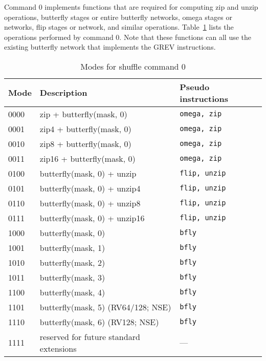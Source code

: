 Command 0 implements functions that are required for computing zip and unzip
operations, butterfly stages or entire butterfly networks, omega stages or networks, flip
stages or network, and similar operations. Table~\ref{shuffle-modes} lists the
operations performed by command 0. Note that these functions can all use the
existing butterfly network that implements the GREV instructions.

\begin{table}[h]
\begin{small}
\begin{center}
\begin{tabular}{l l l}
Mode & Description & Pseudo instructions \\ \hline

0000 & zip + butterfly(mask, 0)                    & {\tt omega, zip} \\
0001 & zip4 + butterfly(mask, 0)                   & {\tt omega, zip} \\
0010 & zip8 + butterfly(mask, 0)                   & {\tt omega, zip} \\
0011 & zip16 + butterfly(mask, 0)                  & {\tt omega, zip} \\
0100 & butterfly(mask, 0) + unzip                  & {\tt flip, unzip} \\
0101 & butterfly(mask, 0) + unzip4                 & {\tt flip, unzip} \\
0110 & butterfly(mask, 0) + unzip8                 & {\tt flip, unzip} \\
0111 & butterfly(mask, 0) + unzip16                & {\tt flip, unzip} \\

\hline

1000 & butterfly(mask, 0)                          & {\tt bfly} \\
1001 & butterfly(mask, 1)                          & {\tt bfly} \\
1010 & butterfly(mask, 2)                          & {\tt bfly} \\
1011 & butterfly(mask, 3)                          & {\tt bfly} \\
1100 & butterfly(mask, 4)                          & {\tt bfly} \\
1101 & butterfly(mask, 5) (RV64/128; NSE)          & {\tt bfly} \\
1110 & butterfly(mask, 6) (RV128; NSE)             & {\tt bfly} \\
1111 & reserved for future standard extensions     & --- \\

\end{tabular}
\end{center}
\end{small}
\caption{Modes for shuffle command 0}
\label{shuffle-modes}
\end{table}

